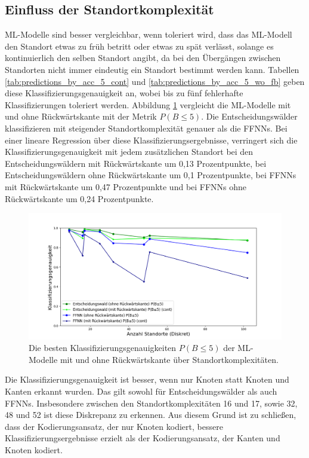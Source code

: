 \subsection{Einfluss der Standortkomplexität}
ML-Modelle sind besser vergleichbar, wenn toleriert wird, dass das ML-Modell den Standort etwas zu früh betritt oder etwas zu spät verlässt,
solange es kontinuierlich den selben Standort angibt, da bei den Übergängen zwischen Standorten nicht immer eindeutig ein Standort bestimmt werden kann.
Tabellen \ref{tab:predictions_by_acc_5_cont} und \ref{tab:predictions_by_acc_5_wo_fb} geben diese Klassifizierungsgenauigkeit an,
wobei bis zu fünf fehlerhafte Klassifizierungen toleriert werden.
\newline
\newline
Abbildung \ref{fig:best_dt_vs_knn_pb_5_vs_pb_5_cont} vergleicht die ML-Modelle mit und ohne Rückwärtskante mit der Metrik $P(B\leq5)$.
Die Entscheidungswälder klassifizieren mit steigender Standortkomplexität genauer als die FFNNs.
Bei einer lineare Regression über diese Klassifizierungsergebnisse,
verringert sich die Klassifizierungsgenauigkeit mit jedem zusätzlichen Standort bei den Entscheidungswäldern mit Rückwärtskante um 0,13 Prozentpunkte,
bei Entscheidungswäldern ohne Rückwärtskante um 0,1 Prozentpunkte,
bei FFNNs mit Rückwärtskante um 0,47 Prozentpunkte und bei FFNNs ohne Rückwärtskante um 0,24 Prozentpunkte.
\begin{figure}[h!]
    \centering
    \includegraphics[width=\linewidth]{images/best_dt_vs_knn_pb_5_vs_pb_5_cont.png}
    \caption{Die besten Klassifizierungsgenauigkeiten $P(B\leq5)$ der ML-Modelle mit und ohne Rückwärtskante über Standortkomplexitäten.}
    \label{fig:best_dt_vs_knn_pb_5_vs_pb_5_cont}
\end{figure}
\newline
\newline
Die Klassifizierungsgenauigkeit ist besser, wenn nur Knoten statt Knoten und Kanten erkannt wurden.
Das gilt sowohl für Entscheidungswälder als auch FFNNs.
Insbesondere zwischen den Standortkomplexitäten 16 und 17, sowie 32, 48 und 52 ist diese Diskrepanz zu erkennen.
Aus diesem Grund ist zu schließen, dass der Kodierungsansatz, der nur Knoten kodiert,
bessere Klassifizierungsergebnisse erzielt als der Kodierungsansatz, der Kanten und Knoten kodiert.

